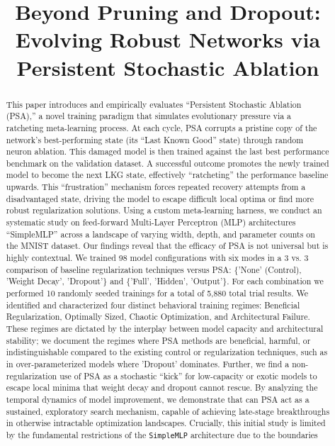 \documentclass[conference]{IEEEtran}
\begin{document}
\title{Beyond Pruning and Dropout: Evolving Robust Networks via Persistent Stochastic Ablation
}

\author{
}

\maketitle

\begin{abstract}

This paper introduces and empirically evaluates ``Persistent Stochastic Ablation (PSA),'' a novel training paradigm that simulates evolutionary pressure via a ratcheting meta-learning process. At each cycle, PSA corrupts a pristine copy of the network's best-performing state (its ``Last Known Good'' state) through random neuron ablation. This damaged model is then trained against the last best performance benchmark on the validation dataset. A successful outcome promotes the newly trained model to become the next LKG state, effectively ``ratcheting'' the performance baseline upwards. This ``frustration'' mechanism forces repeated recovery attempts from a disadvantaged state, driving the model to escape difficult local optima or find more robust regularization solutions. Using a custom meta-learning harness, we conduct an systematic study on feed-forward Multi-Layer Perceptron (MLP) architectures ``SimpleMLP'' across a landscape of varying width, depth, and parameter counts on the MNIST dataset. Our findings reveal that the efficacy of PSA is not universal but is highly contextual. We trained 98 model configurations with six modes in a 3 vs. 3 comparison of baseline regularization techniques versus PSA: \{'None' (Control), 'Weight Decay', 'Dropout'\} and \{'Full', 'Hidden', 'Output'\}. For each combination we performed 10 randomly seeded trainings for a total of 5,880 total trial results. We identified and characterized four distinct behavioral training regimes: Beneficial Regularization, Optimally Sized, Chaotic Optimization, and Architectural Failure. These regimes are dictated by the interplay between model capacity and architectural stability; we document the regimes where PSA methods are beneficial, harmful, or indistinguishable compared to the existing control or regularization techniques, such as in over-parameterized models where 'Dropout' dominates. Further, we find a non-regularization use of PSA as a stochastic ``kick'' for low-capacity or exotic models to escape local minima that weight decay and dropout cannot rescue. By analyzing the temporal dynamics of model improvement, we demonstrate that can PSA act as a sustained, exploratory search mechanism, capable of achieving late-stage breakthroughs in otherwise intractable optimization landscapes. Crucially, this initial study is limited by the fundamental restrictions of the \texttt{SimpleMLP} architecture due to the boundaries 
\end{abstract}
\end{document}
